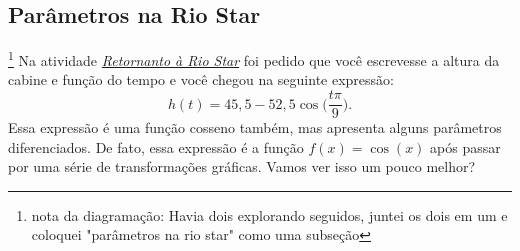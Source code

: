 \label{trig-exp6}


\subsection{Parâmetros na Rio Star}

\footnote{nota da diagramação: Havia dois explorando seguidos, juntei os dois em um e coloquei "parâmetros na rio star" como uma subseção}
Na atividade \hyperref[trig-ativ15]{\textit{Retornanto à Rio Star}} foi pedido que você escrevesse a altura da cabine e função do tempo e você chegou na seguinte expressão:
\begin{equation*}
h(t)=45{,}5-52{,}5\cos\bigg(\frac{t\pi}{9}\bigg).
\end{equation*}
Essa expressão é uma função cosseno também, mas apresenta alguns parâmetros diferenciados. De fato, essa expressão é a função $f(x)=\cos(x)$ após passar por uma série de transformações gráficas. Vamos ver isso um pouco melhor?

